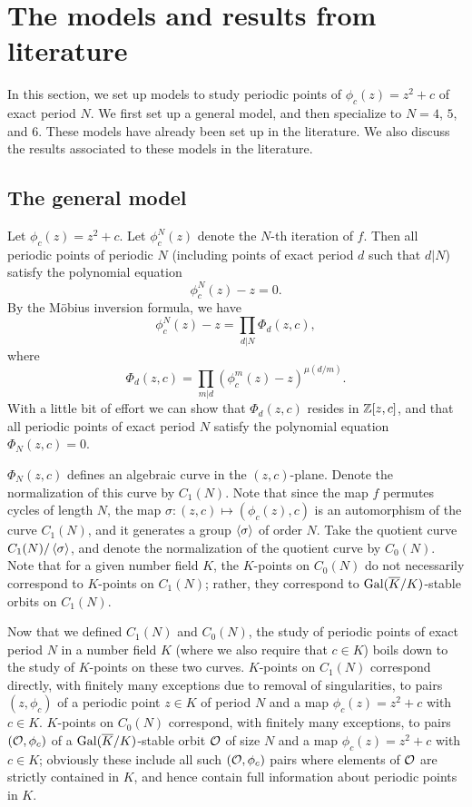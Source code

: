 \section{The models and results from literature}
\label{sec:model}

In this section, we set up models to study periodic points of
$\phi_c(z) = z^2 + c$ of exact period $N$. We first set up a general
model, and then specialize to $N = 4$, $5$, and $6$. These models have
already been set up in the literature. We also discuss the results
associated to these models in the literature.

\subsection{The general model}
\label{subsec:model-general}

Let $\phi_c(z) = z^2 + c$. Let $\phi_c^N(z)$ denote the $N$-th
iteration of $f$. Then all periodic points of periodic $N$ (including
points of exact period $d$ such that $d | N$) satisfy the polynomial
equation
\[
\phi_c^N(z) - z = 0.
\]
By the M\"obius inversion formula, we have
\[
\phi_c^N(z) - z = \prod_{d|N} \Phi_d(z, c),
\]
where
\[
\Phi_d(z, c) = \prod_{m|d}(\phi_c^m(z) - z)^{\mu(d/m)}.
\]
With a little bit of effort we can show that $\Phi_d(z, c)$ resides in
$\mathbb{Z}[z, c]$, and that all periodic points of exact period $N$ satisfy
the polynomial equation $\Phi_N(z, c) = 0$.

$\Phi_N(z, c)$ defines an algebraic curve in the $(z,
c)$-plane. Denote the normalization of this curve by $C_1(N)$. Note
that since the map $f$ permutes cycles of length $N$, the map $\sigma:
(z, c) \mapsto (\phi_c(z), c)$ is an automorphism of the curve
$C_1(N)$, and it generates a group $\left<\sigma\right>$ of order $N$. Take
the quotient curve $C_1(N)/\left<\sigma\right>$, and denote the normalization
of the quotient curve by $C_0(N)$. Note that for a given number field
$K$, the $K$-points on $C_0(N)$ do not necessarily correspond to
$K$-points on $C_1(N)$; rather, they correspond to
$\mathrm{Gal}(\overline{K}/K)$-stable orbits on $C_1(N)$.

Now that we defined $C_1(N)$ and $C_0(N)$, the study of periodic
points of exact period $N$ in a number field $K$ (where we also
require that $c \in K$) boils down to the study of $K$-points on these
two curves. $K$-points on $C_1(N)$ correspond directly, with finitely
many exceptions due to removal of singularities, to pairs $(z,
\phi_c)$ of a periodic point $z \in K$ of period $N$ and a map
$\phi_c(z) = z^2 + c$ with $c \in K$. $K$-points on $C_0(N)$
correspond, with finitely many exceptions, to pairs $(\mathcal{O}, \phi_c)$ of
a $\mathrm{Gal}(\overline{K}/K)$-stable orbit $\mathcal{O}$ of size $N$ and a map $\phi_c(z)
= z^2 + c$ with $c \in K$; obviously these include all such $(\mathcal{O},
\phi_c)$ pairs where elements of $\mathcal{O}$ are strictly contained in $K$,
and hence contain full information about periodic points in $K$.

